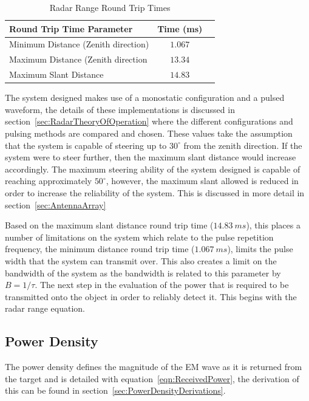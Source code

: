 \documentclass[11pt]{witseiepaper}
\begin{document}
\begin{bibunit}[witseie]
\begin{table}[htb]
    \caption{Radar Range Round Trip Times}
    \label{tab:RadarRangeValues}
    \begin{center}
        \begin{tabular}{p{70mm}cp{70mm}}
            \hline 
            Round Trip Time Parameter & Time (ms) \\
            \hline
            Minimum Distance (Zenith direction) & $1.067$ \\
            Maximum Distance  (Zenith direction & $13.34$ \\
            Maximum Slant Distance & $14.83$ \\
            \hline
        \end{tabular}
    \end{center}
\end{table}
The system designed makes use of a monostatic configuration and a pulsed waveform, the details of these implementations is discussed in section~\ref{sec:RadarTheoryOfOperation} where the different configurations and pulsing methods are compared and chosen.
These values take the assumption that the system is capable of steering up to $30^{\circ}$ from the zenith direction. If the system were to steer further, then the maximum slant distance would increase accordingly. The maximum steering ability of the system designed is capable of reaching approximately $50^{\circ}$, however, the maximum slant allowed is reduced in order to increase the reliability of the system. This is discussed in more detail in section~\ref{sec:AntennaArray} %

Based on the maximum slant distance round trip time ($14.83~ms$), this places a number of limitations on the system which relate to the pulse repetition frequency, the minimum distance round trip time ($1.067~ms$), limits the pulse width that the system can transmit over. This also creates a limit on the bandwidth of the system as the bandwidth is related to this parameter by $B = 1/ \tau$.
The next step in the evaluation of the power that is required to be transmitted onto the object in order to reliably detect it. This begins with the radar range equation.

\subsection{Power Density} \label{sec:PowerDensity}
The power density defines the magnitude of the EM wave as it is returned from the target and is detailed with equation~\ref{eqn:ReceivedPower}, the derivation of this can be found in section~\ref{sec:PowerDensityDerivations}. 


\end{bibunit}
\end{document}

